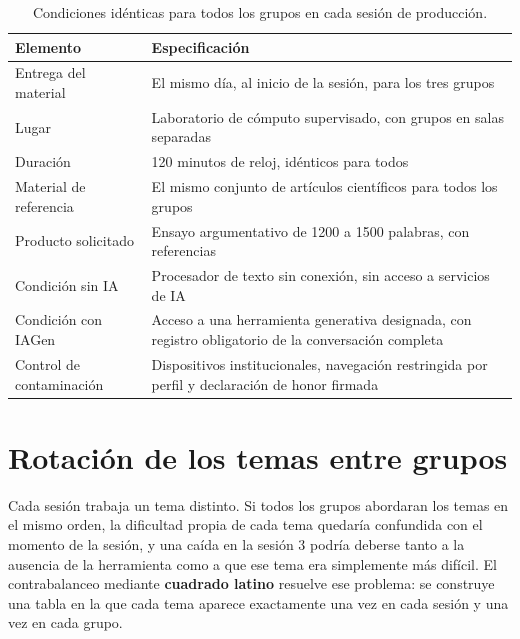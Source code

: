 \documentclass[12pt,a4paper,openany]{report}
\begin{document}
    \begin{table}[htbp]
        \centering
        \caption{Condiciones id\'enticas para todos los grupos en cada sesi\'on de producci\'on.}
        \label{tab:condiciones}
        \small
        \begin{tabular}{L{5.0cm} L{8.5cm}}
            \toprule
            \textbf{Elemento} & \textbf{Especificaci\'on} \\
            \midrule
            Entrega del material & El mismo d\'ia, al inicio de la sesi\'on, para los tres grupos \\
            Lugar & Laboratorio de c\'omputo supervisado, con grupos en salas separadas \\
            Duraci\'on & 120 minutos de reloj, id\'enticos para todos \\
            Material de referencia & El mismo conjunto de art\'iculos cient\'ificos para todos los grupos \\
            Producto solicitado & Ensayo argumentativo de 1200 a 1500 palabras, con referencias \\
            Condici\'on sin IA & Procesador de texto sin conexi\'on, sin acceso a servicios de IA \\
            Condici\'on con IAGen & Acceso a una herramienta generativa designada, con registro obligatorio de la conversaci\'on completa \\
            Control de contaminaci\'on & Dispositivos institucionales, navegaci\'on restringida por perfil y declaraci\'on de honor firmada \\
            \bottomrule
        \end{tabular}
    \end{table}
    
    \section{Rotaci\'on de los temas entre grupos}
    
    Cada sesi\'on trabaja un tema distinto. Si todos los grupos abordaran los temas en el mismo orden, la dificultad propia de cada tema quedar\'ia confundida con el momento de la sesi\'on, y una ca\'ida en la sesi\'on 3 podr\'ia deberse tanto a la ausencia de la herramienta como a que ese tema era simplemente m\'as dif\'icil. El contrabalanceo mediante \textbf{cuadrado latino} resuelve ese problema: se construye una tabla en la que cada tema aparece exactamente una vez en cada sesi\'on y una vez en cada grupo.
    
\end{document}

